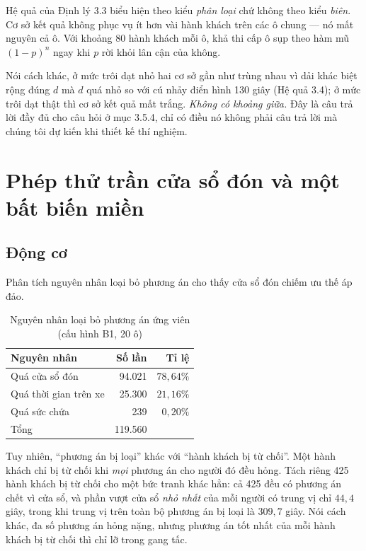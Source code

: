 \begin{khungy}
Hệ quả của Định lý 3.3 biểu hiện theo kiểu \emph{phân loại} chứ không theo kiểu \emph{biên}.
Cơ sở kết quả không phục vụ ít hơn vài hành khách trên các ô chung --- nó mất nguyên cả ô. Với
khoảng 80 hành khách mỗi ô, khả thi cấp ô sụp theo hàm mũ $(1-p)^{n}$ ngay khi $p$ rời khỏi
lân cận của không.
\end{khungy}

Nói cách khác, ở mức trôi dạt nhỏ hai cơ sở gần như trùng nhau vì dải khác biệt rộng đúng $d$
mà $d$ quá nhỏ so với cú nhảy điển hình 130 giây (Hệ quả 3.4); ở mức trôi dạt thật thì cơ sở
kết quả mất trắng. \emph{Không có khoảng giữa.} Đây là câu trả lời đầy đủ cho câu hỏi ở mục
3.5.4, chỉ có điều nó không phải câu trả lời mà chúng tôi dự kiến khi thiết kế thí nghiệm.

\section{Phép thử trần cửa sổ đón và một bất biến miền}
\label{muc:cuaso}

\subsection{Động cơ}

Phân tích nguyên nhân loại bỏ phương án cho thấy cửa sổ đón chiếm ưu thế áp đảo.

\begin{table}[htbp]
\centering
\caption{Nguyên nhân loại bỏ phương án ứng viên (cấu hình B1, 20 ô)}
\label{bang:nguyennhan}
\small
\begin{tabular}{@{}lrr@{}}
\toprule
\textbf{Nguyên nhân} & \textbf{Số lần} & \textbf{Tỉ lệ}\\
\midrule
Quá cửa sổ đón & 94.021 & $78{,}64\%$\\
Quá thời gian trên xe & 25.300 & $21{,}16\%$\\
Quá sức chứa & 239 & $0{,}20\%$\\
\midrule
Tổng & 119.560 & \\
\bottomrule
\end{tabular}
\end{table}

Tuy nhiên, ``phương án bị loại'' khác với ``hành khách bị từ chối''. Một hành khách chỉ bị từ
chối khi \emph{mọi} phương án cho người đó đều hỏng. Tách riêng 425 hành khách bị từ chối cho
một bức tranh khác hẳn: cả 425 đều có phương án chết vì cửa sổ, và phần vượt cửa sổ \emph{nhỏ
nhất} của mỗi người có trung vị chỉ $44{,}4$ giây, trong khi trung vị trên toàn bộ phương án bị
loại là $309{,}7$ giây. Nói cách khác, đa số phương án hỏng nặng, nhưng phương án tốt nhất của
mỗi hành khách bị từ chối thì chỉ lỡ trong gang tấc.

